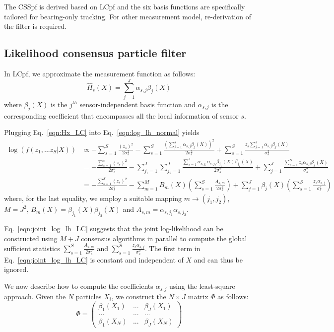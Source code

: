 \documentclass[10pt,letterpaper,final]{article}
\begin{document}
The CSSpf is derived based on LCpf and the six basis functions are specifically tailored for bearing-only tracking. For other measurement model, re-derivation of the filter is required. 

\subsection{Likelihood consensus particle filter}
In LCpf, we approximate the measurement function as follows:
\begin{equation}
\hat{H}_s(X) = \sum_{j=1}^J \alpha_{s,j} \beta_j(X)
\label{eqn:Hx_LC}
\end{equation}
where $\beta_j(X)$ is the $j^{th}$ sensor-independent basis function and $\alpha_{s,j}$ is the corresponding coefficient that encompasses all the local information of sensor $s$. 

Plugging Eq.~\eqref{eqn:Hx_LC} into Eq.~\eqref{eqn:log_lh_normal} yields
\begin{align}
\log(f(z_1,...z_S|X)) &\propto -\sum_{s=1}^S \frac{(z_s)^2}{2\sigma_s^2} -\sum_{s=1}^S \frac{\left( \sum_{j=1}^J \alpha_{s,j} \beta_j(X)\right)^2}{2\sigma_s^2} + \sum_{s=1}^S \frac{z_s\sum_{j=1}^J \alpha_{s,j} \beta_j(X)}{\sigma_s^2} \nonumber \\
&= -\frac{\sum_{s=1}^s(z_s)^2}{2\sigma_s^2} - \sum_{j_1=1}^J\sum_{j_2=1}^J\frac{\sum_{s=1}^s \alpha_{s,j_1}\alpha_{s,j_2} \beta_{j_1}(X)\beta_{j_2}(X)}{2\sigma_s^2}+ \sum_{j=1}^J\frac{\sum_{s=1}^S z_s \alpha_{s,j} \beta_j(X)}{\sigma_s^2} \nonumber \\
&= -\frac{\sum_{s=1}^S(z_s)^2}{2\sigma_s^2} - \sum_{m=1}^MB_{m}(X)\left(\sum_{s=1}^S\frac{A_{s,m} }{2\sigma_s^2}\right)+ \sum_{j=1}^J\beta_j(X)\left(\sum_{s=1}^S\frac{z_s \alpha_{s,j} }{\sigma_s^2}\right)
\label{eqn:joint_log_lh_LC}
\end{align}
where, for the last equality, we employ a suitable mapping $m\rightarrow (j_1,j_2)$, $M=J^2$, $B_m(X)=\beta_{j_1}(X)\beta_{j_2}(X)$ and $A_{s,m} = \alpha_{s,j_1}\alpha_{s,j_2}$. 

Eq.~\eqref{eqn:joint_log_lh_LC} suggests that the joint log-likelihood can be constructed using $M+J$ consensus algorithms in parallel to compute the global sufficient statistics $\sum_{s=1}^S \frac{A_{s,m}}{2\sigma_s^2}$ and $\sum_{s=1}^S \frac{z_s\alpha_{s,j}}{\sigma_s^2}$. The first term in Eq.~\eqref{eqn:joint_log_lh_LC} is constant and independent of $X$ and can thus be ignored. 

We now describe how to compute the coefficients $\alpha_{s,j}$ using the least-square approach. Given the $N$ particles $X_i$, we construct the $N\times J$ matrix $\Phi$ as follows:
\begin{equation}
\Phi=\left(
\begin{array}{ccc}
\beta_1(X_1) & ... & \beta_J(X_1) \\
... & ... & ... \\
\beta_1(X_N) & ... & \beta_J(X_N)
\end{array}
\right)
\label{eqn:beta_matrix}
\end{equation}
\end{document}
